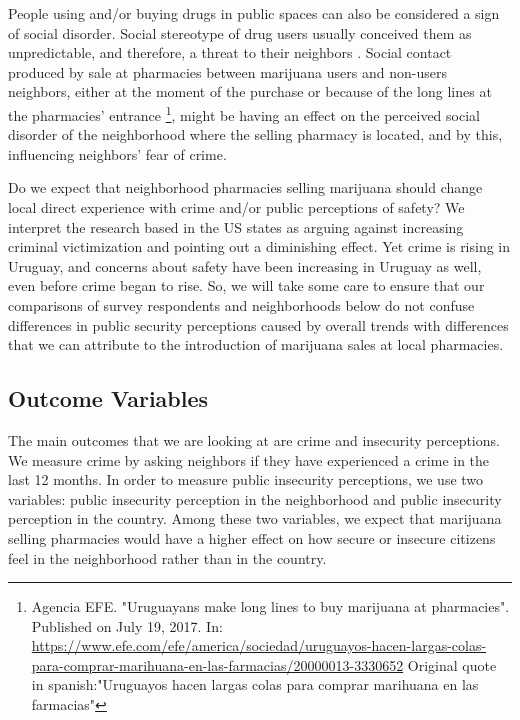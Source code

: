 \documentclass[11pt]{article}
\begin{document}
People using and/or buying drugs in public spaces can also be considered a sign of social disorder. Social stereotype of drug users usually conceived them as unpredictable, and therefore, a threat to their neighbors \citep{bennett1994determinants}. Social contact produced by sale at pharmacies between marijuana users and non-users neighbors, either at the  moment of the purchase or because of the long lines at the pharmacies' entrance \footnote{Agencia EFE. "Uruguayans make long lines to buy marijuana at pharmacies". Published on July 19, 2017. In: \url{https://www.efe.com/efe/america/sociedad/uruguayos-hacen-largas-colas-para-comprar-marihuana-en-las-farmacias/20000013-3330652} Original quote in spanish:"Uruguayos hacen largas colas para comprar marihuana en las farmacias"}, might be having an effect on the perceived social disorder of the neighborhood where the selling pharmacy is located, and by this, influencing neighbors' fear of crime.

Do we expect that neighborhood pharmacies selling marijuana should change local direct experience with crime and/or public perceptions of safety? We interpret the research based in the US states as arguing against increasing criminal victimization and pointing out a diminishing effect. Yet crime is rising in Uruguay, and concerns about safety have been increasing in Uruguay as well, even before crime began to rise. So, we will take some care to ensure that our comparisons of survey respondents and neighborhoods below do not confuse differences in public security perceptions caused by overall trends with differences that we can attribute to the introduction of marijuana sales at local pharmacies.

\subsection{Outcome Variables}
The main outcomes that we are looking at are crime and insecurity perceptions. We measure crime by asking neighbors if they have experienced a crime in the last 12 months. In order to measure public insecurity perceptions, we use two variables: public insecurity perception in the neighborhood and public insecurity perception in the country. Among these two variables, we expect that marijuana selling pharmacies would have a higher effect on how secure or insecure citizens feel in the neighborhood rather than in the country.
\end{document}
